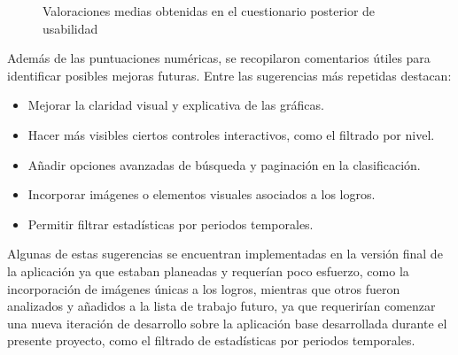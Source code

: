 \begin{figure}[H]
\centering
{}
\caption{Valoraciones medias obtenidas en el cuestionario posterior de usabilidad}
\label{fig:valoraciones_medias_usabilidad}
\end{figure}

Además de las puntuaciones numéricas, se recopilaron comentarios útiles para identificar posibles mejoras futuras. Entre las sugerencias más repetidas destacan:

\begin{itemize}
    \item Mejorar la claridad visual y explicativa de las gráficas.
    \item Hacer más visibles ciertos controles interactivos, como el filtrado por nivel.
    \item Añadir opciones avanzadas de búsqueda y paginación en la clasificación.
    \item Incorporar imágenes o elementos visuales asociados a los logros.
    \item Permitir filtrar estadísticas por periodos temporales.
\end{itemize}

Algunas de estas sugerencias se encuentran implementadas en la versión final de la aplicación ya que estaban planeadas y requerían poco esfuerzo, como la incorporación de imágenes únicas a los logros, mientras que otros fueron analizados y añadidos a la lista de trabajo futuro, ya que requerirían comenzar una nueva iteración de desarrollo sobre la aplicación base desarrollada durante el presente proyecto, como el filtrado de estadísticas por periodos temporales.

